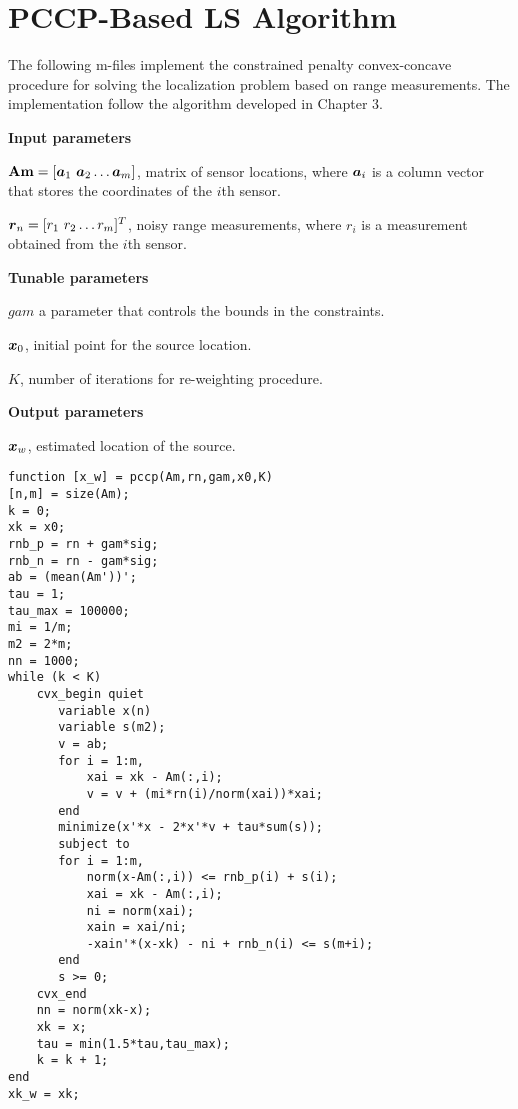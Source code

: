 \section{PCCP-Based LS Algorithm}

The following m-files implement the constrained penalty convex-concave procedure for solving the localization problem based on range measurements. The implementation follow the algorithm developed in Chapter 3.

\phantom{m}

\noindent
\textbf{Input parameters}

\noindent
$\mbox{\textbf{Am}} = [\mbox{\boldmath$a$}_1 \ \mbox{\boldmath$a$}_2 \ldots \mbox{\boldmath$a$}_m]$, matrix of sensor locations, where $\mbox{\boldmath$a$}_i$ is a column vector that stores the coordinates of the $i$th sensor.

\noindent
$\mbox{\boldmath$r$}_n = [r_1 \ r_2 \ldots r_m]^T$, noisy range measurements, where $r_i$ is a measurement obtained from the $i$th sensor.

\noindent
\textbf{Tunable parameters}

\noindent
$gam$ a parameter that controls the bounds in the constraints.

\noindent
$\mbox{\boldmath$x$}_0$, initial point for the source location.

\noindent
$K$, number of iterations for re-weighting procedure.

\noindent
\textbf{Output parameters}

\noindent
$\mbox{\boldmath$x$}_w$, estimated location of the source.

\phantom{m}

\begin{lstlisting}
function [x_w] = pccp(Am,rn,gam,x0,K)
[n,m] = size(Am);
k = 0;
xk = x0;
rnb_p = rn + gam*sig;
rnb_n = rn - gam*sig;
ab = (mean(Am'))';
tau = 1;
tau_max = 100000;
mi = 1/m;
m2 = 2*m;
nn = 1000;
while (k < K) 
    cvx_begin quiet
       variable x(n)
       variable s(m2);
       v = ab;
       for i = 1:m,
           xai = xk - Am(:,i);
           v = v + (mi*rn(i)/norm(xai))*xai;
       end
       minimize(x'*x - 2*x'*v + tau*sum(s));
       subject to
       for i = 1:m,
           norm(x-Am(:,i)) <= rnb_p(i) + s(i);
           xai = xk - Am(:,i);
           ni = norm(xai);
           xain = xai/ni;
           -xain'*(x-xk) - ni + rnb_n(i) <= s(m+i);
       end
       s >= 0;
    cvx_end
    nn = norm(xk-x);
    xk = x;
    tau = min(1.5*tau,tau_max);
    k = k + 1;
end
xk_w = xk;
\end{lstlisting}

\newpage

